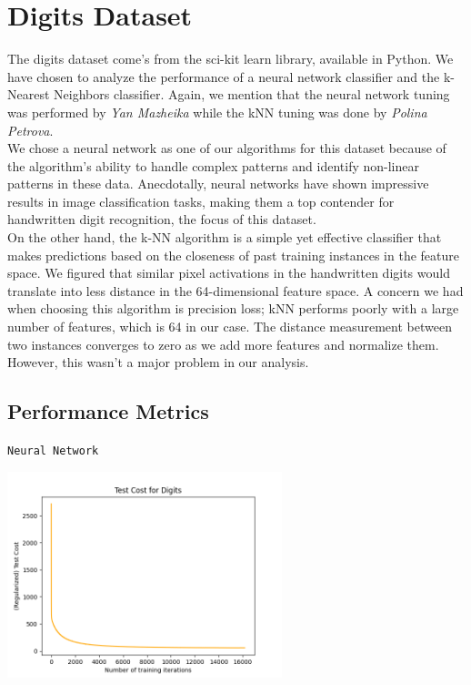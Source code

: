 \documentclass{article}
\begin{document}
\newpage
\section*{Digits Dataset}

The digits dataset come's from the sci-kit learn library, available in Python. We have chosen to analyze the performance of a neural network classifier and the k-Nearest Neighbors classifier. Again, we mention
that the neural network tuning was performed by \textit{Yan Mazheika} while the kNN tuning was done by \textit{Polina Petrova}.
\\

We chose a neural network as one of our algorithms for this dataset because of the algorithm's ability to
handle complex patterns and identify non-linear patterns in these data. Anecdotally, neural networks have shown
impressive results in image classification tasks, making them a top contender for handwritten digit recognition, the focus of this dataset.
\\

On the other hand, the k-NN algorithm is a simple yet effective classifier that makes predictions based on the closeness of past training instances in the feature space. We figured that similar pixel activations in the handwritten digits
would translate into less distance in the 64-dimensional feature space. A concern we had when choosing this algorithm is precision loss; kNN performs poorly with a large number of features, which is 64 in our case. The distance measurement between two instances
converges to zero as we add more features and normalize them. However, this wasn't a major problem in our analysis.

\subsection*{Performance Metrics}
\begin{center}
    \texttt{Neural Network}

    \includegraphics*[width=0.6\textwidth]{./src/figures/Digits-test-cost.png}
\end{center}
\end{document}

